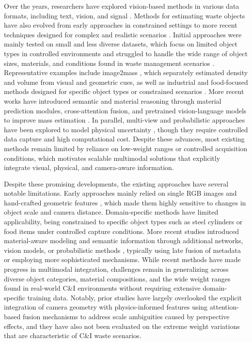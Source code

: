 \documentclass[journal,twoside,web]{ieeecolor}
\begin{document}
Over the years, researchers have explored vision-based methods in various data formats, including text, vision, and signal \cite{xuan2025vista, zhu2024vision+}. Methods for estimating waste objects have also evolved from early approaches in constrained settings to more recent techniques designed for complex and realistic scenarios \cite{li2021automatic}. Initial approaches were mainly tested on small and less diverse datasets, which focus on limited object types in controlled environments and struggled to handle the wide range of object sizes, materials, and conditions found in waste management scenarios \cite{standley2017image2mass, sato2024image, yu2025using}. Representative examples include image2mass \cite{standley2017image2mass}, which separately estimated density and volume from visual and geometric cues, as well as industrial and food-focused methods designed for specific object types or constrained scenarios \cite{sato2024image,lee2025scalable}. More recent works have introduced semantic and material reasoning through material prediction modules, cross-attention fusion, and pretrained vision-language models to improve mass estimation \cite{nath2024mass, wang2025image2mass++}. In parallel, multi-view and probabilistic approaches have been explored to model physical uncertainty \cite{dong2023partial, wen2025partial}, though they require controlled data capture and high computational cost. Despite these advances, most existing methods remain limited by reliance on low-weight ranges or controlled acquisition conditions, which motivates scalable multimodal solutions that explicitly integrate visual, physical, and camera-aware information.

Despite these promising developments, the existing approaches \cite{standley2017image2mass,sato2024image,wang2025image2mass++,nath2024mass} have several notable limitations. Early approaches mainly relied on single RGB images and hand-crafted geometric features \cite{standley2017image2mass}, which made them highly sensitive to changes in object scale and camera distance. Domain-specific methods have limited applicability, being constrained to specific object types such as steel cylinders \cite{sato2024image} or food items \cite{lee2025scalable} under controlled capture conditions. More recent studies introduced material-aware modeling and semantic information through additional networks, vision models, or probabilistic methods \cite{wang2025image2mass++,nath2024mass}, typically using late fusion of metadata or employing more sophisticated mechanisms. While recent methods have made progress in multimodal integration, challenges remain in generalizing across diverse object categories, material compositions, and the wide weight ranges found in real-world C\&I environments without requiring extensive domain-specific training data. Notably, prior studies have largely overlooked the explicit integration of camera geometry with physics-informed features using attention-based fusion mechanisms to address scale ambiguities caused by perspective effects, and they have also not been evaluated on the extreme weight variations that are characteristic of C\&I waste scenarios.
\end{document}
